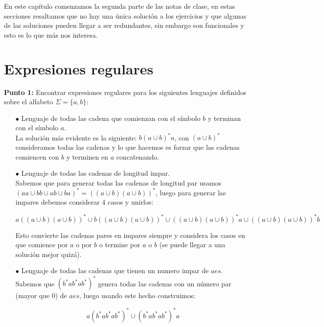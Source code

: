 En este capítulo comenzamos la segunda parte de las notas de clase, en estas secciones resaltamos que no hay una única solución a los ejercicios y que algunas de las soluciones pueden llegar a ser redundantes, sin embargo son funcionales y esto es lo que más nos interesa.

\section{Expresiones regulares}

\textbf{Punto 1: }Encontrar expresiones regulares para los siguientes lenguajes definidos sobre el alfabeto $\Sigma=\{a,b\}:$

\begin{itemize}

    \item[$\bullet$] Lenguaje de todas las cadena que comienzan con el símbolo $b$ y terminan con el símbolo $a$.\\ 

    La solución más evidente es la siguiente: $b(a\cup b)^*a$, con $(a\cup b)^*$ consideramos todas las cadenas y lo que hacemos es forzar que las cadenas comiencen con $b$ y terminen en $a$ concatenando.

    \item[$\bullet$]Lenguaje de todas las cadenas de longitud impar.\\

     Sabemos que para generar todas las cadenas de longitud par usamos $(aa\cup bb\cup ab\cup ba)^*=((a\cup b)(a\cup b))^*$, luego para generar las impares debemos considerar 4 casos y unirlos:

    $$a((a\cup b)(a\cup b))^*\cup b((a\cup b)(a\cup b))^* \cup ((a\cup b)(a\cup b))^*a \cup ((a\cup b)(a\cup b))^*b$$

    Esto convierte las cadenas pares en impares siempre y considera los casos en que comience por $a$ o por $b$ o termine por $a$ o $b$ (se puede llegar a una solución mejor quizá).

    \item[$\bullet$] Lenguaje de todas las cadenas que tienen un numero impar de $aes.$\\ 

    Sabemos que $(b^*ab^*ab^*)^*$ genera todas las cadenas con un número par (mayor que 0) de $aes$, luego usando este hecho construimos:

    $$a(b^*ab^*ab^*)^*\cup (b^*ab^*ab^*)^*a$$


\end{itemize}
